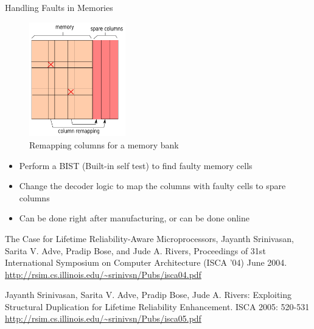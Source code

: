 \documentclass[xcolor=pdftex,dvipsnames,table,svgnames,x11names]{beamer}
\begin{document}
\begin{frame}[shrink=5] {Handling Faults in Memories}
 \begin{center}
  \begin{figure}[h]
   \includegraphics[width=1.65in]{memory}
  \caption{\footnotesize Remapping columns for a memory bank}
  \end{figure}
 \end{center}
\vspace{-7mm}
\begin{itemize}
 \item Perform a BIST (Built-in self test) to find faulty memory cells
  \item Change the decoder logic to map the columns with faulty cells to spare columns
  \item Can be done right after manufacturing, or can be done online
\end{itemize}

\end{frame}


\small
\begin{thebibliography}{10}
The Case for Lifetime Reliability-Aware Microprocessors, Jayanth Srinivasan, 
Sarita V. Adve, Pradip Bose, and Jude A. Rivers, Proceedings of 31st International 
Symposium on Computer Architecture (ISCA '04) June 2004.\\
\url{http://rsim.cs.illinois.edu/~srinivsn/Pubs/isca04.pdf}

Jayanth Srinivasan, Sarita V. Adve, Pradip Bose, Jude A. Rivers: Exploiting Structural 
Duplication for Lifetime Reliability Enhancement. ISCA 2005: 520-531\\
\url{http://rsim.cs.illinois.edu/~srinivsn/Pubs/isca05.pdf}

\end{thebibliography}
\end{document}
